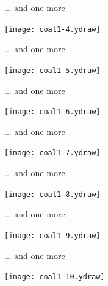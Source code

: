 \documentclass[bluish,slideColor,colorBG,pdf]{prosper}
\begin{document}
\begin{slide}[Replace]{ ... and one more}

\vspace{-0.2in}

\centerline{\texttt{[image: coal1-4.ydraw]}}

\end{slide}

\begin{slide}[Replace]{ ... and one more}

\vspace{-0.2in}

\centerline{\texttt{[image: coal1-5.ydraw]}}

\end{slide}

\begin{slide}[Replace]{ ... and one more}

\vspace{-0.2in}

\centerline{\texttt{[image: coal1-6.ydraw]}}

\end{slide}

\begin{slide}[Replace]{ ... and one more}

\vspace{-0.2in}

\centerline{\texttt{[image: coal1-7.ydraw]}}

\end{slide}

\begin{slide}[Replace]{ ... and one more}

\vspace{-0.2in}

\centerline{\texttt{[image: coal1-8.ydraw]}}

\end{slide}

\begin{slide}[Replace]{ ... and one more}

\vspace{-0.2in}

\centerline{\texttt{[image: coal1-9.ydraw]}}

\end{slide}

\begin{slide}[Replace]{ ... and one more}

\vspace{-0.2in}

\centerline{\texttt{[image: coal1-10.ydraw]}}

\end{slide}
\end{document}
